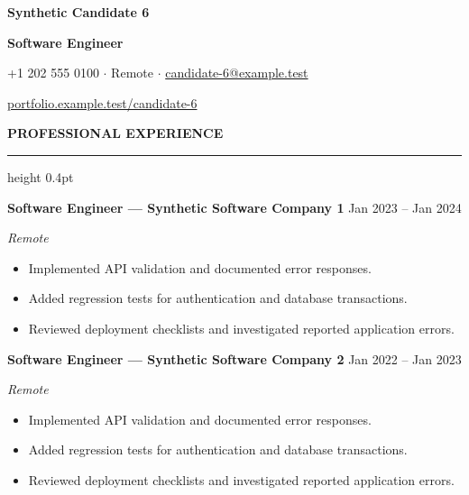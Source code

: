 \documentclass[10pt,a4paper]{article}
\newcommand{\atsHeaderToSection}{10pt}
\newcommand{\atsHeadingToContent}{3pt}
\newcommand{\atsEntryToEntry}{5pt}
\newcommand{\atsRoleToMetadata}{1.5pt}
\newcommand{\atsMetadataToBullets}{2.5pt}
\newcommand{\atsBulletToBullet}{1.2pt}
\newcommand{\atsfirstsection}[1]{%
  \vspace{\atsHeaderToSection}%
  {\noindent\large\bfseries\uppercase{#1}}\par
  \vspace{1.5pt}\hrule height 0.4pt\vspace{\atsHeadingToContent}%
}
\begin{document}
{\centering
  {\Huge \textbf{Synthetic Candidate 6}}\par
  \vspace{3pt}
  {\large \textbf{Software Engineer}}\par
  \vspace{3pt}
  {\small +1 202 555 0100 $\cdot$ Remote $\cdot$ \href{mailto:candidate-6@example.test}{candidate-6@example.test}}\par
  \vspace{2pt}
  {\small \href{https://portfolio.example.test/candidate-6}{portfolio.example.test/candidate-6}}\par
}

\atsfirstsection{Professional Experience}
\textbf{Software Engineer — Synthetic Software Company 1} \hfill Jan 2023 -- Jan 2024\par
\vspace{\atsRoleToMetadata}
{\small\textit{Remote}}\par
\vspace{\atsMetadataToBullets}
\begin{itemize}
\setlength{\itemsep}{\atsBulletToBullet}\setlength{\parskip}{0pt}\setlength{\parsep}{0pt}\setlength{\topsep}{0pt}\setlength{\partopsep}{0pt}
  \item Implemented API validation and documented error responses.
  \item Added regression tests for authentication and database transactions.
  \item Reviewed deployment checklists and investigated reported application errors.
\end{itemize}
\vspace{\atsEntryToEntry}
\textbf{Software Engineer — Synthetic Software Company 2} \hfill Jan 2022 -- Jan 2023\par
\vspace{\atsRoleToMetadata}
{\small\textit{Remote}}\par
\vspace{\atsMetadataToBullets}
\begin{itemize}
\setlength{\itemsep}{\atsBulletToBullet}\setlength{\parskip}{0pt}\setlength{\parsep}{0pt}\setlength{\topsep}{0pt}\setlength{\partopsep}{0pt}
  \item Implemented API validation and documented error responses.
  \item Added regression tests for authentication and database transactions.
  \item Reviewed deployment checklists and investigated reported application errors.
\end{itemize}
\end{document}
